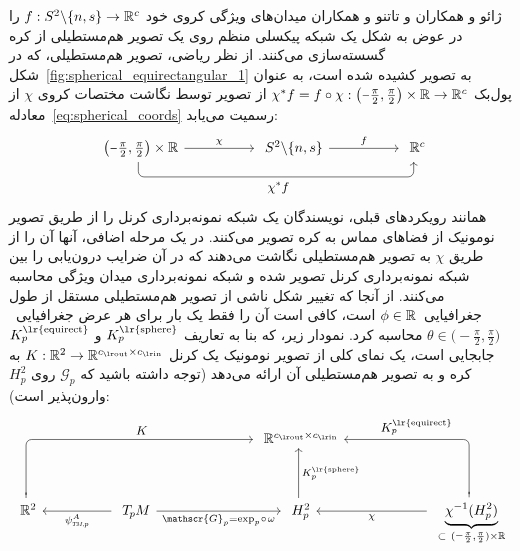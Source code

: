 ژائو و همکاران\cite{zhao2018distortion} و تاتنو و همکاران\cite{tateno2018distortion} میدان‌های ویژگی کروی خود $f: S^2 \backslash \{n,s\} \to \mathbb{R}^c$ را در عوض به شکل یک شبکه پیکسلی منظم روی یک تصویر هم‌مستطیلی از کره گسسته‌سازی می‌کنند.
از نظر ریاضی، تصویر هم‌مستطیلی، که در شکل~\ref{fig:spherical_equirectangular_1} به تصویر کشیده شده است، به عنوان پول‌بک
$\chi^*f = f \circ \chi: \big(\minus\frac{\pi}{2}, \frac{\pi}{2}\big) \times \R \to \R^c$
از تصویر توسط نگاشت مختصات کروی $\chi$ از معادله~\eqref{eq:spherical_coords} رسمیت می‌یابد:
\begin{equation}\label{cd:equirectangular_proj}
\begin{tikzcd}[column sep=50pt, row sep=25pt, font=\normalsize]
    {\big(\minus\frac{\pi}{2}, \frac{\pi}{2}\big)} \times \R
        \arrow[r, "\chi"]
        \arrow[rr, pos=.5, rounded corners, to path={ 
            -- ([yshift=-2.5ex]\tikztostart.south) 
            --node[below]{\small$
                \chi^*f
                $} ([yshift=-2.5ex]\tikztotarget.south) 
            -- (\tikztotarget.south)
            }]
    & S^2 \backslash \{n,s\}
        \arrow[r, "f"]
    & \R^c \mkern-12mu\phantom{\big)}
\end{tikzcd}
\end{equation}
همانند رویکردهای قبلی، نویسندگان یک شبکه نمونه‌برداری کرنل را از طریق تصویر نومونیک از فضاهای مماس به کره تصویر می‌کنند.
در یک مرحله اضافی، آنها آن را از طریق $\chi$ به تصویر هم‌مستطیلی نگاشت می‌دهند که در آن ضرایب درون‌یابی را بین شبکه نمونه‌برداری کرنل تصویر شده و شبکه نمونه‌برداری میدان ویژگی محاسبه می‌کنند.
از آنجا که تغییر شکل ناشی از تصویر هم‌مستطیلی مستقل از طول جغرافیایی~$\phi \in \mathbb{R}$ است، کافی است آن را فقط یک بار برای هر عرض جغرافیایی~$\theta \in {\textstyle \big(\minus\frac{\pi}{2}, \frac{\pi}{2}\big)}$ محاسبه کرد.
نمودار زیر، که بنا به تعاریف $K^{\textup{\lr{sphere}}}_p$ و $K^{\textup{\lr{equirect}}}_p$ جابجایی است، یک نمای کلی از تصویر نومونیک یک کرنل $K: \R^2 \to \R^{\cout\times\cin}$ به کره \cite{coors2018spherenet,eder2019convolutions,martin2020panoramic} و به تصویر هم‌مستطیلی آن \cite{zhao2018distortion,tateno2018distortion} ارائه می‌دهد (توجه داشته باشید که $\mathscr{G}_p$ روی $H_p^2$ وارون‌پذیر است):
\begin{equation}
\begin{tikzcd}[column sep=50pt, row sep=36pt, font=\normalsize]
    & &[20pt]
    \R^{\cout\times\cin}
    \\
    \R^2
        \arrow[urr, pos=.75, rounded corners, to path={ 
            -- ([yshift=0pt]\tikztostart.north) 
            |-node[above]{\small$
                 K
                $} ([xshift=0ex]\tikztotarget.west) 
            }]
    & \TpM
        \arrow[l, "\psiTMp^A"]
        \arrow[r, "\mathscr{G}_p = \exp_p\mkern-2mu\circ\mkern2mu\omega"']
    & H_p^2
        \arrow[u, "K_p^\textup{\lr{sphere}}\,"']
    &[10pt] \underbrace{\chi^{-1}(H_p^2)}_{\subset\ (\protect\minus\frac{\pi}{2}, \frac{\pi}{2}) \times \R}
        \arrow[l, "\chi"]
        \arrow[ul, pos=.72, rounded corners, to path={ 
            -- ([yshift=0pt]\tikztostart.north) 
            |-node[above]{\small$
                 K^{\textup{\lr{equirect}}}_p
                $} ([xshift=0ex]\tikztotarget.east) 
            }]
\end{tikzcd}
\end{equation}
